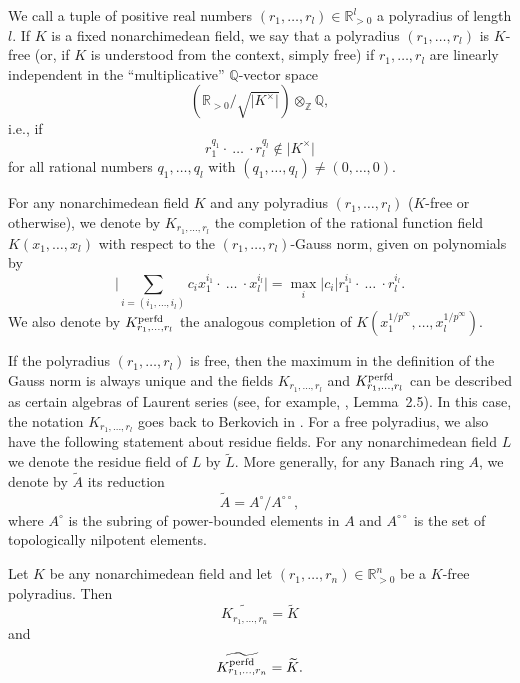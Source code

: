 We call a tuple of positive real numbers $(r_1,\dots, r_l)\in \mathbb{R}_{>0}^{l}$ a polyradius of length $l$. If $K$ is a fixed nonarchimedean field, we say that a polyradius $(r_1,\dots, r_l)$ is $K$-free (or, if $K$ is understood from the context, simply free) if $r_1,\dots, r_l$ are linearly independent in the ``multiplicative'' $\mathbb{Q}$-vector space \begin{equation*}(\mathbb{R}_{>0}/\sqrt{\vert K^{\times}\vert})\otimes_{\mathbb{Z}}\mathbb{Q},\end{equation*}i.e., if \begin{equation*}r_{1}^{q_{1}}\cdot~\dots~\cdot r_{l}^{q_{l}}\not\in \vert K^{\times}\vert\end{equation*}for all rational numbers $q_1,\dots, q_l$ with $(q_1,\dots, q_l)\neq (0,\dots, 0)$. 
\begin{defn}For any nonarchimedean field $K$ and any polyradius $(r_1,\dots, r_l)$ ($K$-free or otherwise), we denote by $K_{r_1,\dots, r_l}$ the completion of the rational function field $K(x_1,\dots, x_l)$ with respect to the $(r_1,\dots, r_l)$-Gauss norm, given on polynomials by \begin{equation*}\vert \sum_{i=(i_1,\dots, i_{l})}c_{i}x_{1}^{i_{1}}\cdot~\dots~\cdot x_{l}^{i_{l}}\vert=\max_{i}\vert c_{i}\vert r_{1}^{i_{1}}\cdot~\dots~\cdot r_{l}^{i_{l}}.\end{equation*}We also denote by $K_{r_1,\dots, r_l}^{\operatorname{perfd}}$ the analogous completion of $K(x_{1}^{1/p^{\infty}},\dots, x_{l}^{1/p^{\infty}})$. \end{defn}
If the polyradius $(r_1,\dots, r_l)$ is free, then the maximum in the definition of the Gauss norm is always unique and the fields $K_{r_1,\dots, r_l}$ and $K_{r_1,\dots, r_l}^{\operatorname{perfd}}$ can be described as certain algebras of Laurent series (see, for example, \cite{Dine-Garzella25}, Lemma~2.5). In this case, the notation $K_{r_1,\dots, r_l}$ goes back to Berkovich in \cite{Berkovich}. For a free polyradius, we also have the following statement about residue fields. For any nonarchimedean field $L$ we denote the residue field of $L$ by $\widetilde{L}$. More generally, for any Banach ring $A$, we denote by $\widetilde{A}$ its reduction \begin{equation*}\widetilde{A}=A^{\circ}/A^{\circ\circ},\end{equation*}where $A^{\circ}$ is the subring of power-bounded elements in $A$ and $A^{\circ\circ}$ is the set of topologically nilpotent elements.  
\begin{lemma}\label{Residue fields}Let $K$ be any nonarchimedean field and let $(r_1,\dots, r_n)\in \mathbb{R}_{>0}^{n}$ be a $K$-free polyradius. Then \begin{equation*}\widetilde{K_{r_1,\dots, r_n}}=\widetilde{K}\end{equation*}and\begin{equation*}\widetilde{K_{r_1,\dots, r_n}^{\operatorname{perfd}}}=\widetilde{K}.\end{equation*} \end{lemma}
